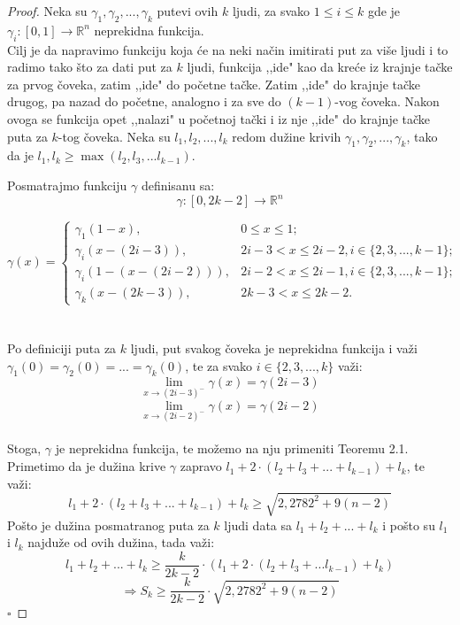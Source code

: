 \documentclass[11pt,letter]{article}
\newcommand{\qed}{\hfill $\square$ \bigskip}
\begin{document}
\begin{proof}
Neka su $\gamma_1, \gamma_2,..., \gamma_k$ putevi ovih $k$ ljudi, za svako $1\leqslant i\leqslant k$ gde je
$\gamma_i: [0,1]\to \mathbb{R}^n$ neprekidna funkcija.
\\
\indent Cilj je da napravimo funkciju koja \' ce na neki na\v cin imitirati put za vi\v se ljudi i to radimo tako \v sto za dati put za $k$ ljudi, funkcija ,,ide" kao da kre\' ce iz krajnje ta\v cke za prvog \v coveka, zatim ,,ide" do po\v cetne ta\v cke. Zatim ,,ide" do krajnje ta\v cke drugog, pa nazad do po\v cetne, analogno i za sve do $(k-1)$-vog \v coveka.  Nakon ovoga se funkcija opet ,,nalazi" u po\v cetnoj ta\v cki i iz nje ,,ide" do krajnje ta\v cke puta za $k$-tog \v coveka.
Neka su $l_1, l_2,...,l_k$ redom du\v zine krivih $\gamma_1, \gamma_2,..., \gamma_k$, tako da je $l_1, l_k\geqslant \max{(l_2,l_3,...l_{k-1})}.$

 Posmatrajmo funkciju $\gamma$ definisanu sa:
$$\gamma: [0, 2k-2]\to \mathbb{R}^n$$

\[ \gamma(x) = \begin{cases}  
          \gamma_1(1-x), & 0\leqslant x\leqslant 1; \\
          \gamma_i(x-(2i-3)), & 2i-3< x \leqslant2i-2, i\in\{2,3,...,k-1\};\\
	 \gamma_i (1-(x-(2i-2))),& 2i-2< x\leqslant 2i-1, i \in\{2,3,...,k-1\};\\
          \gamma_k(x-(2k-3)), & 2k-3<x \leqslant 2k-2.
       \end{cases}
 \]
\\
\\
\indent Po definiciji puta za $k$ ljudi, put svakog \v coveka je neprekidna funkcija i va\v zi $\gamma_1(0)=\gamma_2(0)=...=\gamma_k(0)$, te za svako $i\in \{2,3,...,k\}$ va\v zi:
$$\lim_{x\to (2i-3)^-}\gamma(x)=\gamma(2i-3)$$
$$\lim_{x\to (2i-2)^-}\gamma(x)=\gamma(2i-2)$$
\\
\indent Stoga,  $\gamma$ je neprekidna funkcija, te mo\v zemo na nju primeniti Teoremu 2.1. Primetimo da je du\v zina krive $\gamma$ zapravo $l_1+2\cdot(l_2+l_3+...+l_{k-1})+l_k$, te va\v zi:
$$l_1+2\cdot(l_2+l_3+...+l_{k-1})+l_k\geqslant\sqrt{2,2782^2+9(n-2)}$$
\indent Po\v sto je du\v zina posmatranog puta za $k$ ljudi data sa $l_1+l_2+...+l_k$ i po\v sto su $l_1$ i $l_k$ najdu\v ze od ovih du\v zina, tada va\v zi:
$$l_1+l_2+...+l_k\geqslant \frac{k}{2k-2}\cdot (l_1+2\cdot(l_2+l_3+...l_{k-1})+l_k)$$
$$\Longrightarrow S_k\geqslant \frac{k}{2k-2}\cdot \sqrt{2,2782^2+9(n-2)}$$\qed
\end{proof}
\end{document}
